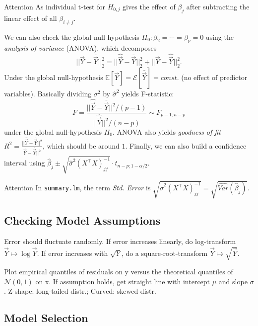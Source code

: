 \begin{attentionbox}{Attention}\nospacing{}
 As individual t-test for $H_{0,j}$ gives the effect of $\beta_{j}$ after subtracting the linear effect of all $\beta_{i\neq j}$.
\end{attentionbox}

 \begin{sectionbox}\nospacing{}
  We can also check the global null-hypothesis $H_{0}: \beta_{2} = \cdots = \beta_{p} = 0$ using the \emph{analysis of variance} (ANOVA), which decomposes
  \[||\vec{Y} - \bar{\vec{Y}}||^{2}_{2} = ||\hat{\vec{Y}} - \bar{\vec{Y}}||^{2}_{2} + ||\vec{Y} - \hat{\vec{Y}}||^{2}_{2}.\]
  Under the global null-hypothesis $\mathbb{E}[\vec{Y}] = \mathcal{E}[\bar{\vec{Y}}] = const$. (no effect of predictor variables). Basically dividing $\sigma^{2}$ by $\hat \sigma^{2}$ yields F-statistic:
  \[F = \frac{||\hat{\vec{Y}} - \bar{\vec{Y}}||^{2}/(p-1)}{||\hat{\vec{Y}}||^{2} / (n-p)} \sim F_{p-1,n-p}\] under the global null-hypothesis $H_{0}$.
  ANOVA also yields \emph{goodness of fit} $R^{2} = \frac{||\hat{\vec{Y}} - \bar{\vec{Y}}||^{2}}{\vec{Y} - \bar{\vec{Y}}||^{2}}$, which should be around $1$.
  Finally, we can also build a confidence interval using $\hat \beta_{j} \pm \sqrt{\hat \sigma^{2}{{(X^{\top}X)}^{-1}_{jj}}} \cdot t_{n-p;1-\alpha/2}$.
 \end{sectionbox}

\begin{attentionbox}{Attention}\nospacing{}
 In \verb!summary.lm!, the term \emph{Std. Error} is $\sqrt{\hat \sigma^{2}{{(X^{\top}X)}^{-1}_{jj}}} = \sqrt{\hat{Var}(\hat \beta_{j})}$.
\end{attentionbox}

\subsection{Checking Model Assumptions}\label{subsec:checking_model_assumptions}
\begin{sectionbox}\nospacing{}
  Error should fluctuate randomly. If error increases linearly, do log-transform $\vec{Y} \mapsto \log{\vec{Y}}$. If error increases with $\sqrt{Y}$, do a square-root-transform $\vec{Y} \mapsto \sqrt{\vec{Y}}$.
\end{sectionbox}
\begin{sectionbox}\nospacing{}
  Plot empirical quantiles of residuals on y versus the theoretical quantiles of $\mathcal{N}(0,1)$ on x.
  If assumption holds, get straight line with intercept $\mu$ and slope $\sigma$.
  Z-shape: long-tailed distr.; Curved: skewed distr.
\end{sectionbox}
\subsection{Model Selection}\label{subsec:model_selection}

